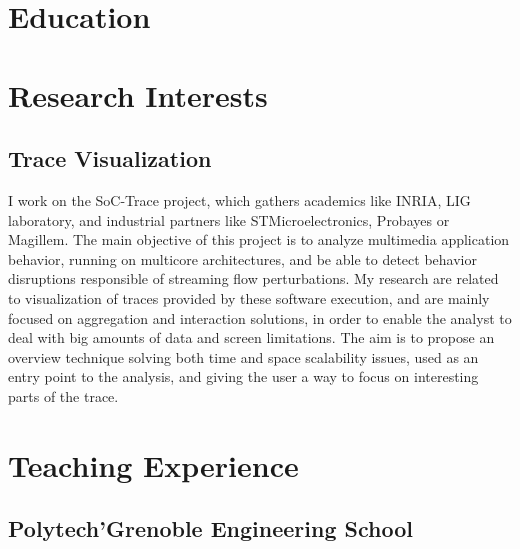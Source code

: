 \documentclass[11pt,a4paper]{moderncv}
\begin{document}
\section{Education}

\section{Research Interests}

\subsection{Trace Visualization}

%
{I work on the SoC-Trace project, which gathers academics like INRIA, LIG laboratory, and industrial partners like STMicroelectronics, Probayes or Magillem. The main objective of this project is to analyze multimedia application behavior, running on multicore architectures, and be able to detect behavior disruptions responsible of streaming flow perturbations. My research are related to visualization of traces provided by these software execution, and are mainly focused on aggregation and interaction solutions, in order to enable the analyst to deal with big amounts of data and screen limitations. The aim is to propose an overview technique solving both time and space scalability issues, used as an entry point to the analysis, and giving the user a way to focus on interesting parts of the trace.}

\section{Teaching Experience}
\subsection{Polytech'Grenoble Engineering School}
\end{document}
